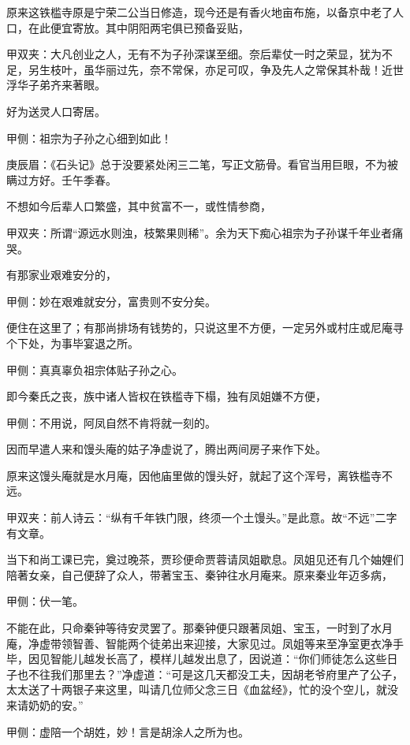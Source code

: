 \begin{parag}
    原来这铁槛寺原是宁荣二公当日修造，现今还是有香火地亩布施，以备京中老了人口，在此便宜寄放。其中阴阳两宅俱已预备妥贴，\begin{note}甲双夹：大凡创业之人，无有不为子孙深谋至细。奈后辈仗一时之荣显，犹为不足，另生枝叶，虽华丽过先，奈不常保，亦足可叹，争及先人之常保其朴哉！近世浮华子弟齐来著眼。\end{note}好为送灵人口寄居。\begin{note}甲侧：祖宗为子孙之心细到如此！\end{note}\begin{note}庚辰眉：《石头记》总于没要紧处闲三二笔，写正文筋骨。看官当用巨眼，不为被瞒过方好。壬午季春。\end{note}不想如今后辈人口繁盛，其中贫富不一，或性情参商，\begin{note}甲双夹：所谓“源远水则浊，枝繁果则稀”。余为天下痴心祖宗为子孙谋千年业者痛哭。\end{note}有那家业艰难安分的，\begin{note}甲侧：妙在艰难就安分，富贵则不安分矣。\end{note}便住在这里了；有那尚排场有钱势的，只说这里不方便，一定另外或村庄或尼庵寻个下处，为事毕宴退之所。\begin{note}甲侧：真真辜负祖宗体贴子孙之心。\end{note}即今秦氏之丧，族中诸人皆权在铁槛寺下榻，独有凤姐嫌不方便，\begin{note}甲侧：不用说，阿凤自然不肯将就一刻的。\end{note}因而早遣人来和馒头庵的姑子净虚说了，腾出两间房子来作下处。
\end{parag}


\begin{parag}
    原来这馒头庵就是水月庵，因他庙里做的馒头好，就起了这个浑号，离铁槛寺不远。\begin{note}甲双夹：前人诗云：“纵有千年铁门限，终须一个土馒头。”是此意。故“不远”二字有文章。\end{note}当下和尚工课已完，奠过晚茶，贾珍便命贾蓉请凤姐歇息。凤姐见还有几个妯娌们陪著女亲，自己便辞了众人，带著宝玉、秦钟往水月庵来。原来秦业年迈多病，\begin{note}甲侧：伏一笔。\end{note}不能在此，只命秦钟等待安灵罢了。那秦钟便只跟著凤姐、宝玉，一时到了水月庵，净虚带领智善、智能两个徒弟出来迎接，大家见过。凤姐等来至净室更衣净手毕，因见智能儿越发长高了，模样儿越发出息了，因说道：“你们师徒怎么这些日子也不往我们那里去？”净虚道：“可是这几天都没工夫，因胡老爷府里产了公子，太太送了十两银子来这里，叫请几位师父念三日《血盆经》，忙的没个空儿，就没来请奶奶的安。”\begin{note}甲侧：虚陪一个胡姓，妙！言是胡涂人之所为也。\end{note}
\end{parag}


